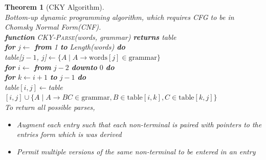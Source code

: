 \documentclass[12pt]{article}
\newcommand{\ind}{\hspace*{15pt}}
\newtheorem{theorem}{Theorem}[section]
\theoremstyle{definition}
\begin{document}
\begin{theorem}[CKY Algorithm]
\hfill\\\normalfont Bottom-up dynamic programming algorithm, which requires CFG to be in Chomsky Normal Form(CNF).\\
\textbf{function} \textsc{CKY-Parse}(words, grammar) \textbf{returns} table\\
\textbf{for} $j\leftarrow$ \textbf{from} 1 \textbf{to} Length(words) \textbf{do}\\
\ind table[$j-1$, $j$]$\leftarrow\{A\mid A\to \text{words}[j] \in \text{grammar}\}$\\
\ind \textbf{for} $i\leftarrow$ \textbf{from} $j-2$ \textbf{downto} $0$ \textbf{do}\\
\ind \ind \textbf{for} $k\leftarrow i + 1$ \textbf{ to } $j-1$ \textbf{do}\\
\ind\ind\ind table$[i,j]\leftarrow$table$[i,j]\cup\{A\mid A\to BC\in \text{grammar}, B\in \text{table}[i,k], C\in \text{table}[k,j]\}$\\

To return all possible parses,
\begin{itemize}
	\item Augment each entry such that each non-terminal is paired with pointers to the entries form which is was derived
	\item Permit multiple versions of the same non-terminal to be entered in an entry
\end{itemize}
\end{theorem}
\end{document}

